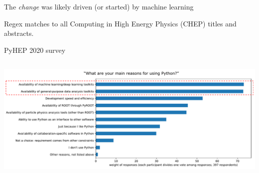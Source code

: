 \documentclass[aspectratio=169]{beamer}
\begin{document}
\begin{frame}{The {\it change} was likely driven (or started) by machine learning}
\vspace{0.25 cm}

Regex matches to all Computing in High Energy Physics (CHEP) titles and abstracts.

\vspace{-0.1 cm}
\begin{center}
\end{center}
\end{frame}

\begin{frame}{PyHEP 2020 survey}
\vspace{0.5 cm}
\begin{columns}
\includegraphics[width=\linewidth]{PLOTS/pyhep2020-why-use-python.pdf}
\end{columns}
\end{frame}
\end{document}
